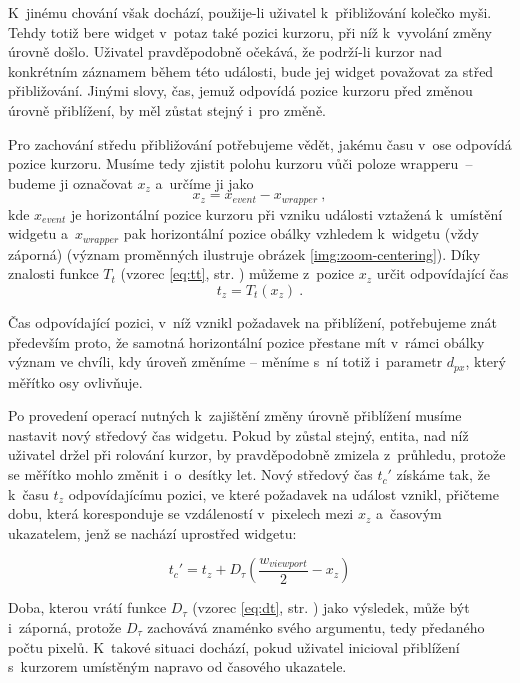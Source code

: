 			 K~jinému chování však dochází, použije-li uživatel k~přibližování kolečko myši. Tehdy totiž bere widget v~potaz také pozici kurzoru, při níž k~vyvolání změny úrovně došlo. Uživatel pravděpodobně očekává, že podrží-li kurzor nad konkrét\-ním záznamem během této události, bude jej widget považovat za střed přibli\-žování. Jinými slovy, čas, jemuž odpovídá pozice kurzoru před změnou úrovně přiblížení, by měl zůstat stejný i~pro změně.
				
				Pro zachování středu přibližování potřebujeme vědět, jakému času v~ose odpovídá pozice kurzoru. Musíme tedy zjistit polohu kurzoru vůči poloze wrapperu~-- budeme ji označovat $x_z$ a~určíme ji jako
				$$x_z = x_{event} - x_{wrapper}\ ,$$
				kde $x_{event}$ je horizontální pozice kurzoru při vzniku události vztažená k~umístění widgetu a~$x_{wrapper}$ pak horizontální pozice obálky vzhledem k~widgetu (vždy záporná) (význam proměnných ilustruje obrázek \ref{img:zoom-centering}). Díky znalosti funkce $T_t$ (vzorec \ref{eq:tt}, str. \pageref{eq:tt}) můžeme z~pozice $x_z$ určit odpovídající čas
				$$t_z = T_t(x_z)\ .$$
				
				Čas odpovídající pozici, v~níž vznikl požadavek na přiblížení, potřebujeme znát především proto, že samotná horizontální pozice přestane mít v~rámci obálky význam ve chvíli, kdy úroveň změníme -- měníme s~ní totiž i~parametr $d_{px}$, který měřítko osy ovlivňuje.
				
				Po provedení operací nutných k~zajištění změny úrovně přiblížení musíme nastavit nový středový čas widgetu. Pokud by zůstal stejný, entita, nad níž uživatel držel při rolování kurzor, by pravděpodobně zmizela z~průhledu, protože se měřítko mohlo změnit i~o~desítky let. Nový středový čas $t_c'$ získáme tak, že k~času $t_z$ odpovídajícímu pozici, ve které požadavek na událost vznikl, přičteme dobu, která koresponduje se vzdáleností v~pixelech mezi $x_z$ a~časovým ukazatelem, jenž se nachází uprostřed widgetu:
				
				\begin{equation}
				\label{eq:stred-priblizeni}
				t_c' = t_z + D_\tau\left(\frac{w_{viewport}}{2} - x_z\right)
				\end{equation}
				
				Doba, kterou vrátí funkce $D_\tau$ (vzorec \ref{eq:dt}, str. \pageref{eq:dt}) jako výsledek, může být i~záporná, protože $D_\tau$ zachovává znaménko svého argumentu, tedy předaného počtu pixelů. K~takové situaci dochází, pokud uživatel inicioval přiblížení s~kurzorem umístěným napravo od časového ukazatele.
				
